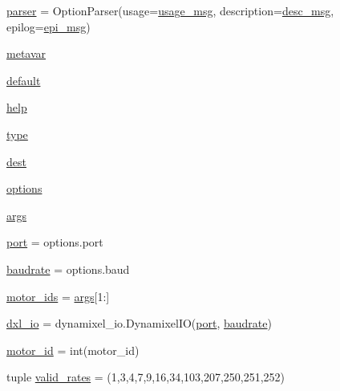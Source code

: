\begin{DoxyCompactItemize}
\item 
\hyperlink{namespaceset__servo__config_a31cf164b74aedc9fbcd68b74615b6ac2}{parser} = Option\+Parser(usage=\hyperlink{namespaceset__servo__config_afb62a54e4938e903420f62984507fdd8}{usage\+\_\+msg}, description=\hyperlink{namespaceset__servo__config_a8e653627e0edc71d67503af40c92f022}{desc\+\_\+msg}, epilog=\hyperlink{namespaceset__servo__config_a5c22d68865380f08b6c332373297893a}{epi\+\_\+msg})
\item 
\hyperlink{namespaceset__servo__config_aa5d67729fdd1fb79530eed591683ce69}{metavar}
\item 
\hyperlink{namespaceset__servo__config_ad46f98777fc12bcd4bdc61733e926726}{default}
\item 
\hyperlink{namespaceset__servo__config_abb77c82a1847ecaa4cae095059a0f025}{help}
\item 
\hyperlink{namespaceset__servo__config_abfe30d9b712ec84b87591b41835b0446}{type}
\item 
\hyperlink{namespaceset__servo__config_a6408e25902173969cd091873aa3f2613}{dest}
\item 
\hyperlink{namespaceset__servo__config_ac255726a992a254f0b0e6072b0f86233}{options}
\item 
\hyperlink{namespaceset__servo__config_a938193d08b751c10549aa8a48cb96402}{args}
\item 
\hyperlink{namespaceset__servo__config_a324ec25da2c0124a9184e551f96f1419}{port} = options.\+port
\item 
\hyperlink{namespaceset__servo__config_ab4f26033683458550a8b26b78b5cbd47}{baudrate} = options.\+baud
\item 
\hyperlink{namespaceset__servo__config_a2c4d55fcec026b0598d2bc6c6079e7fc}{motor\+\_\+ids} = \hyperlink{namespaceset__servo__config_a938193d08b751c10549aa8a48cb96402}{args}\mbox{[}1\+:\mbox{]}
\item 
\hyperlink{namespaceset__servo__config_a214021294c0a39eaf23ef537bfc60705}{dxl\+\_\+io} = dynamixel\+\_\+io.\+Dynamixel\+IO(\hyperlink{namespaceset__servo__config_a324ec25da2c0124a9184e551f96f1419}{port}, \hyperlink{namespaceset__servo__config_ab4f26033683458550a8b26b78b5cbd47}{baudrate})
\item 
\hyperlink{namespaceset__servo__config_aaa903250c8425443f306994f3f66c073}{motor\+\_\+id} = int(motor\+\_\+id)
\item 
tuple \hyperlink{namespaceset__servo__config_a36ffc5e0e58ceabf57966c17a63b792c}{valid\+\_\+rates} = (1,3,4,7,9,16,34,103,207,250,251,252)
\end{DoxyCompactItemize}


